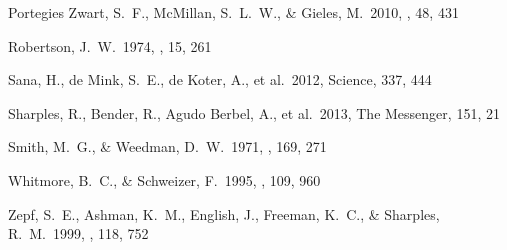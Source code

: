 \documentclass[useAMS,usenatbib]{mn2e}
\begin{document}
\begin{thebibliography}{99}
 Portegies Zwart, S.~F., McMillan, S.~L.~W., \& Gieles, M.\ 2010, \araa, 48, 431

 Robertson, J.~W.\ 1974, \aaps, 15, 261

 Sana, H., de Mink, S.~E.,
de Koter, A., et al.\ 2012, Science, 337, 444

 Sharples, R., Bender,
R., Agudo Berbel, A., et al.\ 2013, The Messenger, 151, 21

 Smith, M.~G., \& Weedman, D.~W.\ 1971, \apj, 169, 271

 Whitmore, B.~C., \& Schweizer, F.\ 1995, \aj, 109, 960

 Zepf, S.~E., Ashman,
K.~M., English, J., Freeman, K.~C., \& Sharples, R.~M.\ 1999, \aj, 118, 752
\end{thebibliography}
\label{lastpage}
\end{document}
